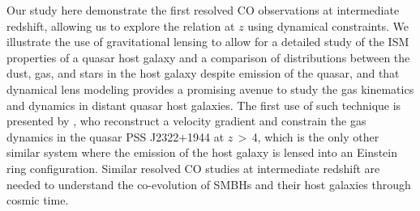 \documentclass[]{emulateapj}
\begin{document}
Our study here demonstrate the first resolved CO observations at intermediate redshift, allowing us to
explore the \bhrelation relation at $z$ using dynamical constraints.
We illustrate the use of gravitational lensing to allow for a detailed study of the ISM properties of a quasar host galaxy
and a comparison of distributions between the dust, gas, and stars in the host galaxy despite emission of the quasar, and that
dynamical lens modeling provides a promising avenue 
to study the gas kinematics and dynamics in distant quasar host galaxies. 
The first use of such technique is presented by \citet{Riechers08a}, who reconstruct a velocity gradient and 
constrain the gas dynamics in the quasar PSS J2322$+$1944 at $z$\,$>$\,4, which is
the only other similar system where the emission of the host galaxy is lensed into an Einstein ring configuration.
Similar resolved CO studies at intermediate redshift are needed to understand the co-evolution of SMBHs and their 
host galaxies through cosmic time. 
\end{document}
